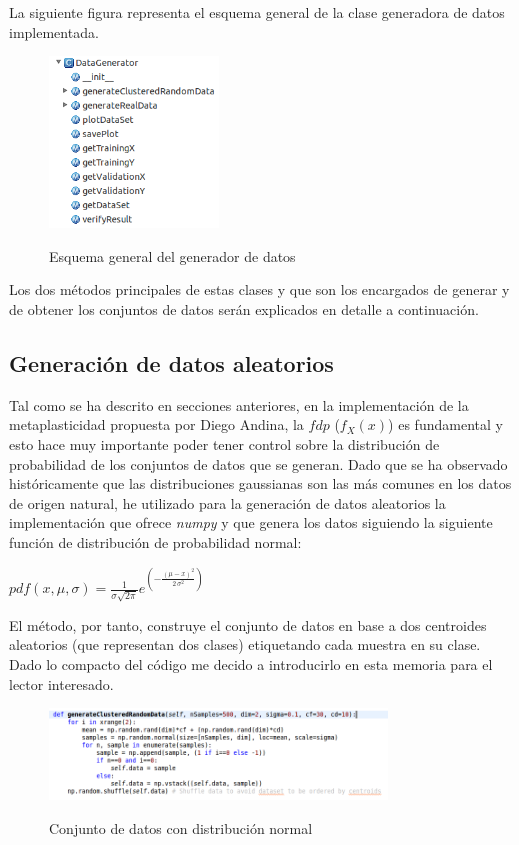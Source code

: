 \documentclass[10pt,a4paper]{report}
\begin{document}
La siguiente figura representa el esquema general de la clase generadora de datos implementada.
\begin{figure}[!h]{}
    \centering
    \includegraphics[width=0.4\textwidth]{img/GeneradorEsquema.png}
    \label{fig:EsquemaGenerador}
    \caption{Esquema general del generador de datos}
\end{figure}
Los dos métodos principales de estas clases y que son los encargados de generar y de obtener los conjuntos de datos serán explicados en detalle a continuación.

\subsection{Generación de datos aleatorios}
Tal como se ha descrito en secciones anteriores, en la implementación de la metaplasticidad propuesta por Diego Andina\citep{Andina2009}, la $fdp$ ($f_X(x)$) es fundamental y esto hace muy importante poder tener control sobre la distribución de probabilidad de los conjuntos de datos que se generan. Dado que se ha observado históricamente que las distribuciones gaussianas son las más comunes en los datos de origen natural, he utilizado para la generación de datos aleatorios la implementación que ofrece \textit{numpy} y que genera los datos siguiendo la siguiente función de distribución de probabilidad normal: 

\begin{center}
$pdf(x,\mu,\sigma) = \frac{1}{ \sigma \sqrt{2 \pi}} e^{\left(-\frac{{\left(\mu - x\right)}^{2}}{2 \, \sigma^{2}}\right)}$
\end{center}

El método, por tanto, construye el conjunto de datos en base a dos centroides aleatorios (que representan dos clases) etiquetando cada muestra en su clase. Dado lo compacto del código me decido a introducirlo en esta memoria para el lector interesado.
\begin{figure}[!h]{}
    \centering
    \includegraphics[width=0.8\textwidth]{img/generateClusteredRandomData.png}
    \label{fig:generateRandomMethod}
    \caption{Conjunto de datos con distribución normal}
\end{figure}
\end{document}
